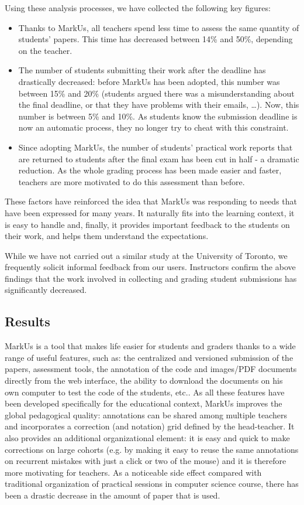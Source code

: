 \documentclass[twocolumn,10pt]{asme2e}
\begin{document}
Using these analysis processes, we have collected the following key figures: 
\begin{itemize}
\item Thanks to MarkUs, all teachers spend less time to assess the same quantity of students' papers. This time has decreased between 14\% and 50\%, depending on the teacher. 
\item The number of students submitting their work after the deadline has drastically decreased: before MarkUs has been adopted, this number was between 15\% and 20\% (students argued there was a misunderstanding about the final deadline, or that they have problems with their emails, \dots).  Now, this number is between 5\% and 10\%. As students know the submission deadline is now an automatic process, they no longer try to cheat with this constraint. 
\item Since adopting MarkUs, the number of students' practical work reports that are returned to students after the final exam has been cut in half - a dramatic reduction. As the whole grading process has been made easier and faster, teachers are more motivated to do this assessment than before. 
\end{itemize}

These factors have reinforced the idea that MarkUs was responding to needs that have been expressed for many years. It naturally fits into the learning context, it is easy to handle and, finally, it provides important feedback to the students on their work, and helps them understand the expectations.

While we have not carried out a similar study at the University of Toronto, we frequently solicit informal feedback from our users. Instructors confirm the above findings that the work involved in collecting and grading student submissions has significantly decreased.

\subsection*{Results}

MarkUs is a tool that makes life easier for students and graders thanks to a wide range of useful features, such as: the centralized and versioned submission of the papers, assessment tools, the annotation of the code and images/PDF documents directly from the web interface, the ability to download the documents on his own computer to test the code of the students, etc.. As all these  features have been developed specifically for the educational context, MarkUs improves the global pedagogical quality: annotations can be shared among multiple teachers and incorporates a correction (and notation) grid defined by the head-teacher. It also provides an additional organizational element: it is easy and quick to make corrections on large cohorts (e.g. by making it easy to reuse the same annotations on recurrent mistakes with just a click or two of the mouse) and it is therefore more motivating for teachers. As a noticeable side effect compared with traditional organization of practical sessions in computer science course, there has been a drastic decrease in the amount of paper that is used. 
\end{document}
